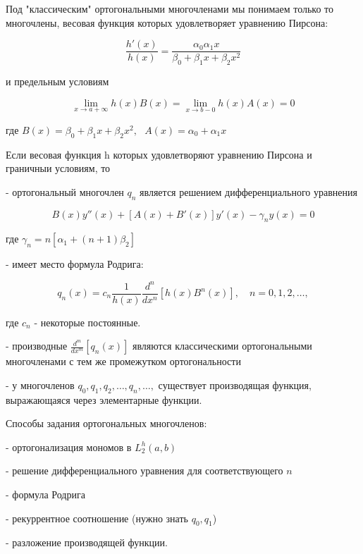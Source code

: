 \documentclass[12pt, a4paper]{report}
\begin{document}
Под "классическим" ортогональными многочленами мы понимаем только то многочлены, весовая функция которых удовлетворяет уравнению Пирсона: 

\[ \frac{h' (x )}{h(x )} = \frac{ \alpha_0 \alpha_1 x }{\beta_0 + \beta_1 x + \beta_2 x ^2 }   \] 

и предельным условиям 

\[ \lim_{x  \to a+\infty } h(x ) B(x ) = \lim_{x \to b -0 } h(x )A(x ) = 0  \] 

где \( B(x ) = \beta_0 + \beta_1 x + \beta_2  x ^2 , \text{ }  A (x ) = \alpha_0    + \alpha_1 x \) 


Если весовая функция h которых удовлетворяют уравнению Пирсона и граничныи условиям, то 

- ортогональный многочлен \( q_n      \) является решением дифференциального уравнения 

\[ B(x ) y''(x )+ [A(x )+ B' (x )]y'(x )- \gamma_n y(x )= 0\] 

где \( \gamma_n = n [ \alpha_1 + (n+1 )\beta_2 ] \) 

- имеет место формула Родрига: 

\[ q_n(x ) = c_n \frac{1 }{h(x )} \frac{d^n }{d x ^n } [ h(x )B^n (x )] , \quad  n=0,1,2,\ldots,  \] 

где \( c_n \) - некоторые постоянные. 

- производные \( \displaystyle  \frac{ d^m }{d x^{m} }  [q_n(x )]\) являются классическими ортогональными многочленами с тем же промежутком ортогональности 

- у многочленов \( q_0,q_1 ,q_2, \ldots, q_n, \ldots,  \) существует производящая функция, выражающаяся через элементарные функции.

Способы задания ортогональных многочленов: 

- ортогонализация  мономов в \( L_2^{h } (a,b ) \) 

- решение дифференциального уравнения для соответствующего \( n \) 

- формула Родрига 

- рекуррентное соотношение (нужно знать \( q_0,q_1 \))

- разложение производящей функции.



\ifdefined\mainfile
\else
    
\end{document}
